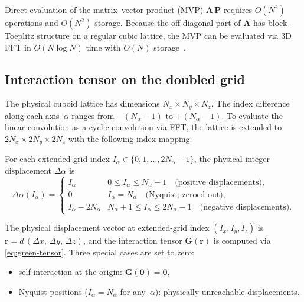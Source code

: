 \documentclass[11pt,a4paper]{article}
\begin{document}
Direct evaluation of the matrix--vector product (MVP)
$\mathbf{A}\,\bm{P}$ requires $O(N^2)$ operations and $O(N^2)$ storage.
Because the off-diagonal part of $\mathbf{A}$ has block-Toeplitz structure
on a regular cubic lattice, the MVP can be evaluated via 3D FFT in
$O(N \log N)$ time with $O(N)$ storage~\cite{Goodman1991}.

\subsection{Interaction tensor on the doubled grid}
\label{sec:doubled-grid}

The physical cuboid lattice has dimensions $N_x \times N_y \times N_z$.
The index difference along each axis~$\alpha$ ranges from
$-(N_\alpha - 1)$ to $+(N_\alpha - 1)$.
To evaluate the linear convolution as a cyclic convolution via FFT,
the lattice is extended to $2N_x \times 2N_y \times 2N_z$ with the
following index mapping.

For each extended-grid index $I_\alpha \in \{0, 1, \ldots, 2N_\alpha - 1\}$,
the physical integer displacement $\Delta\alpha$ is
\begin{equation}
  \Delta\alpha(I_\alpha) =
  \begin{cases}
    I_\alpha            & 0 \le I_\alpha \le N_\alpha - 1
                          \quad\text{(positive displacements)}, \\
    0                   & I_\alpha = N_\alpha
                          \quad\text{(Nyquist; zeroed out)}, \\
    I_\alpha - 2N_\alpha & N_\alpha + 1 \le I_\alpha \le 2N_\alpha - 1
                          \quad\text{(negative displacements)}.
  \end{cases}
  \label{eq:index-mapping}
\end{equation}

The physical displacement vector at extended-grid index
$(I_x, I_y, I_z)$ is
$\bm{r} = d\,(\Delta x,\, \Delta y,\, \Delta z)$,
and the interaction tensor $\mathbf{G}(\bm{r})$ is computed via
\eqref{eq:green-tensor}.
Three special cases are set to zero:
\begin{itemize}
  \item self-interaction at the origin:
        $\mathbf{G}(\bm{0}) = \mathbf{0}$,
  \item Nyquist positions ($I_\alpha = N_\alpha$ for any~$\alpha$):
        physically unreachable displacements.
\end{itemize}
\end{document}
